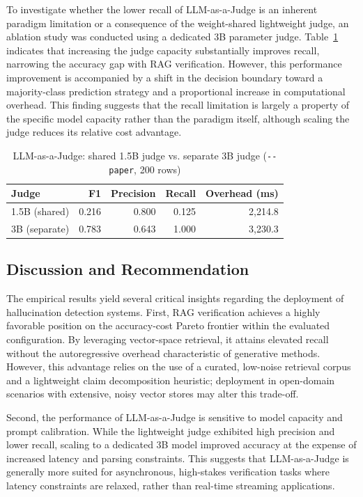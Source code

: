 \documentclass[conference]{IEEEtran}
\begin{document}
To investigate whether the lower recall of LLM-as-a-Judge is an inherent paradigm limitation or a consequence of the weight-shared lightweight judge, an ablation study was conducted using a dedicated 3B parameter judge. Table~\ref{tab:strong-judge} indicates that increasing the judge capacity substantially improves recall, narrowing the accuracy gap with RAG verification. However, this performance improvement is accompanied by a shift in the decision boundary toward a majority-class prediction strategy and a proportional increase in computational overhead. This finding suggests that the recall limitation is largely a property of the specific model capacity rather than the paradigm itself, although scaling the judge reduces its relative cost advantage.

\begin{table}[!htbp]
\caption{LLM-as-a-Judge: shared 1.5B judge vs. separate 3B judge (\texttt{-{}-paper}, 200 rows)}
\label{tab:strong-judge}
\centering
\small
\begin{tabular}{@{}lrrrr@{}}
\toprule
Judge          & F1    & Precision & Recall & Overhead (ms) \\
\midrule
1.5B (shared)  & 0.216 & 0.800     & 0.125  & 2{,}214.8 \\
3B (separate)  & 0.783 & 0.643     & 1.000  & 3{,}230.3 \\
\bottomrule
\end{tabular}
\end{table}

\FloatBarrier
\subsection{Discussion and Recommendation}

The empirical results yield several critical insights regarding the deployment of hallucination detection systems. First, RAG verification achieves a highly favorable position on the accuracy-cost Pareto frontier within the evaluated configuration. By leveraging vector-space retrieval, it attains elevated recall without the autoregressive overhead characteristic of generative methods. However, this advantage relies on the use of a curated, low-noise retrieval corpus and a lightweight claim decomposition heuristic; deployment in open-domain scenarios with extensive, noisy vector stores may alter this trade-off.

Second, the performance of LLM-as-a-Judge is sensitive to model capacity and prompt calibration. While the lightweight judge exhibited high precision and lower recall, scaling to a dedicated 3B model improved accuracy at the expense of increased latency and parsing constraints. This suggests that LLM-as-a-Judge is generally more suited for asynchronous, high-stakes verification tasks where latency constraints are relaxed, rather than real-time streaming applications.
\end{document}
